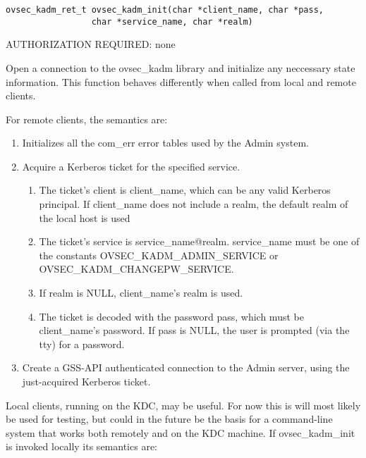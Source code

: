 \begin{verbatim}
ovsec_kadm_ret_t ovsec_kadm_init(char *client_name, char *pass,
				 char *service_name, char *realm)
\end{verbatim}

AUTHORIZATION REQUIRED: none

Open a connection to the ovsec_kadm library and initialize any
neccessary state information.  This function behaves differently when
called from local and remote clients.

For remote clients, the semantics are:

\begin{enumerate}
\item Initializes all the com_err error tables used by the Admin
system.

\item Acquire a Kerberos ticket for the specified service.

\begin{enumerate}
\item The ticket's client is client_name, which can be any valid
Kerberos principal.  If client_name does not include a realm, the
default realm of the local host is used
\item The ticket's service is service_name@realm.  service_name must
be one of the constants OVSEC_KADM_ADMIN_SERVICE or
OVSEC_KADM_CHANGEPW_SERVICE.
\item If realm is NULL, client_name's realm is used.
\item The ticket is decoded with the password pass, which must be
client_name's password.  If pass is NULL, the user is prompted (via
the tty) for a password.
\end{enumerate}

\item Create a GSS-API authenticated connection to the Admin server,
using the just-acquired Kerberos ticket.
\end{enumerate}

Local clients, running on the KDC, may be useful. For now this is will
most likely be used for testing, but could in the future be the basis
for a command-line system that works both remotely and on the KDC
machine.  If ovsec_kadm_init is invoked locally its semantics are:

